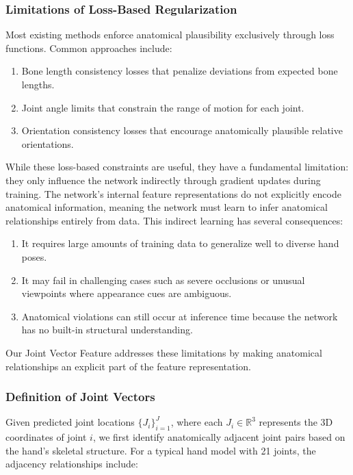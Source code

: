 \subsubsection{Limitations of Loss-Based Regularization}
Most existing methods enforce anatomical plausibility exclusively through loss functions. Common approaches include:

\begin{enumerate}
    \item[(a)] Bone length consistency losses that penalize deviations from expected bone lengths.
    \item[(b)] Joint angle limits that constrain the range of motion for each joint.
    \item[(c)] Orientation consistency losses that encourage anatomically plausible relative orientations.
\end{enumerate}

While these loss-based constraints are useful, they have a fundamental limitation: they only influence the network indirectly through gradient updates during training. The network's internal feature representations do not explicitly encode anatomical information, meaning the network must learn to infer anatomical relationships entirely from data. This indirect learning has several consequences:

\begin{enumerate}
    \item[(a)] It requires large amounts of training data to generalize well to diverse hand poses.
    \item[(b)] It may fail in challenging cases such as severe occlusions or unusual viewpoints where appearance cues are ambiguous.
    \item[(c)] Anatomical violations can still occur at inference time because the network has no built-in structural understanding.
\end{enumerate}

Our Joint Vector Feature addresses these limitations by making anatomical relationships an explicit part of the feature representation.

\subsubsection{Definition of Joint Vectors}
Given predicted joint locations \(\{J_i\}_{i=1}^{J}\), where each \(J_i \in \mathbb{R}^3\) represents the 3D coordinates of joint \(i\), we first identify anatomically adjacent joint pairs based on the hand's skeletal structure. For a typical hand model with 21 joints, the adjacency relationships include:

